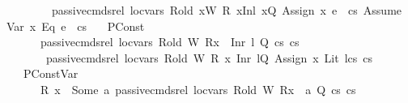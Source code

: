 \begin{isabellebody}
\ \ \ \ \ \ \ \ passive{\isacharunderscore}{\kern0pt}cmds{\isacharunderscore}{\kern0pt}rel\ loc{\isacharunderscore}{\kern0pt}vars\ R{\isacharunderscore}{\kern0pt}old\ {\isacharparenleft}{\kern0pt}x{}{\isacharhash}{\kern0pt}W{\isacharparenright}{\kern0pt}\ R\ {\isacharparenleft}{\kern0pt}{\isacharparenleft}{\kern0pt}x{}{\isacharcomma}{\kern0pt}{\isacharparenleft}{\kern0pt}Inl\ x{}{\isacharparenright}{\kern0pt}{\isacharparenright}{\kern0pt}{\isacharhash}{\kern0pt}Q{\isacharparenright}{\kern0pt}\ {\isacharparenleft}{\kern0pt}{\isacharparenleft}{\kern0pt}Assign\ x{}\ e{}{\isacharparenright}{\kern0pt}\ {\isacharhash}{\kern0pt}\ cs{}{\isacharparenright}{\kern0pt}\ {\isacharparenleft}{\kern0pt}{\isacharparenleft}{\kern0pt}Assume\ {\isacharparenleft}{\kern0pt}{\isacharparenleft}{\kern0pt}Var\ x{}{\isacharparenright}{\kern0pt}\ {\isasymguillemotleft}Eq{\isasymguillemotright}\ e{}{\isacharparenright}{\kern0pt}{\isacharparenright}{\kern0pt}\ {\isacharhash}{\kern0pt}\ cs{}{\isacharparenright}{\kern0pt}{\isachardoublequoteclose}\isanewline
\ \ {\isacharbar}{\kern0pt}\ PConst{\isacharcolon}{\kern0pt}\isanewline
\ \ \ \ {\isachardoublequoteopen}\ {\isasymlbrakk}\ passive{\isacharunderscore}{\kern0pt}cmds{\isacharunderscore}{\kern0pt}rel\ loc{\isacharunderscore}{\kern0pt}vars\ R{\isacharunderscore}{\kern0pt}old\ W\ {\isacharparenleft}{\kern0pt}R{\isacharparenleft}{\kern0pt}x{}\ {\isasymmapsto}\ {\isacharparenleft}{\kern0pt}Inr\ l{\isacharparenright}{\kern0pt}{\isacharparenright}{\kern0pt}{\isacharparenright}{\kern0pt}\ Q\ cs{}\ cs{}\ {\isasymrbrakk}\ {\isasymLongrightarrow}\isanewline
\ \ \ \ \ \ \ passive{\isacharunderscore}{\kern0pt}cmds{\isacharunderscore}{\kern0pt}rel\ loc{\isacharunderscore}{\kern0pt}vars\ R{\isacharunderscore}{\kern0pt}old\ W\ R\ {\isacharparenleft}{\kern0pt}{\isacharparenleft}{\kern0pt}x{}{\isacharcomma}{\kern0pt}\ {\isacharparenleft}{\kern0pt}Inr\ l{\isacharparenright}{\kern0pt}{\isacharparenright}{\kern0pt}{\isacharhash}{\kern0pt}Q{\isacharparenright}{\kern0pt}\ {\isacharparenleft}{\kern0pt}{\isacharparenleft}{\kern0pt}Assign\ x{}\ {\isacharparenleft}{\kern0pt}Lit\ l{\isacharparenright}{\kern0pt}{\isacharparenright}{\kern0pt}{\isacharhash}{\kern0pt}cs{}{\isacharparenright}{\kern0pt}\ cs{}{\isachardoublequoteclose}\isanewline
\ \ {\isacharbar}{\kern0pt}\ PConstVar{\isacharcolon}{\kern0pt}\isanewline
\ \ \ \ {\isachardoublequoteopen}\ {\isasymlbrakk}\ R\ x{}{\isacharprime}{\kern0pt}\ {\isacharequal}{\kern0pt}\ Some\ a{\isacharsemicolon}{\kern0pt}\ passive{\isacharunderscore}{\kern0pt}cmds{\isacharunderscore}{\kern0pt}rel\ loc{\isacharunderscore}{\kern0pt}vars\ R{\isacharunderscore}{\kern0pt}old\ W\ {\isacharparenleft}{\kern0pt}R{\isacharparenleft}{\kern0pt}x{}\ {\isasymmapsto}\ a{\isacharparenright}{\kern0pt}{\isacharparenright}{\kern0pt}\ Q\ cs{}\ cs{}\ {\isasymrbrakk}\ {\isasymLongrightarrow}\isanewline

\end{isabellebody}
